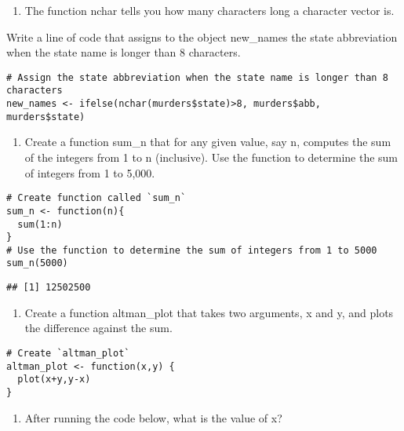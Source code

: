 \documentclass[]{article}
\providecommand{\tightlist}{%
  \setlength{\itemsep}{0pt}\setlength{\parskip}{0pt}}
\begin{document}
\begin{enumerate}
\def\labelenumi{\arabic{enumi}.}
\setcounter{enumi}{2}
\tightlist
\item
  The function nchar tells you how many characters long a character
  vector is.
\end{enumerate}

Write a line of code that assigns to the object new\_names the state
abbreviation when the state name is longer than 8 characters.

\begin{verbatim}
# Assign the state abbreviation when the state name is longer than 8 characters 
new_names <- ifelse(nchar(murders$state)>8, murders$abb, murders$state)
\end{verbatim}

\begin{enumerate}
\def\labelenumi{\arabic{enumi}.}
\setcounter{enumi}{3}
\tightlist
\item
  Create a function sum\_n that for any given value, say n, computes the
  sum of the integers from 1 to n (inclusive). Use the function to
  determine the sum of integers from 1 to 5,000.
\end{enumerate}

\begin{verbatim}
# Create function called `sum_n`
sum_n <- function(n){
  sum(1:n)
}
# Use the function to determine the sum of integers from 1 to 5000
sum_n(5000)
\end{verbatim}

\begin{verbatim}
## [1] 12502500
\end{verbatim}

\begin{enumerate}
\def\labelenumi{\arabic{enumi}.}
\setcounter{enumi}{4}
\tightlist
\item
  Create a function altman\_plot that takes two arguments, x and y, and
  plots the difference against the sum.
\end{enumerate}

\begin{verbatim}
# Create `altman_plot` 
altman_plot <- function(x,y) {
  plot(x+y,y-x)
}
\end{verbatim}

\begin{enumerate}
\def\labelenumi{\arabic{enumi}.}
\setcounter{enumi}{5}
\tightlist
\item
  After running the code below, what is the value of x?
\end{enumerate}
\end{document}
